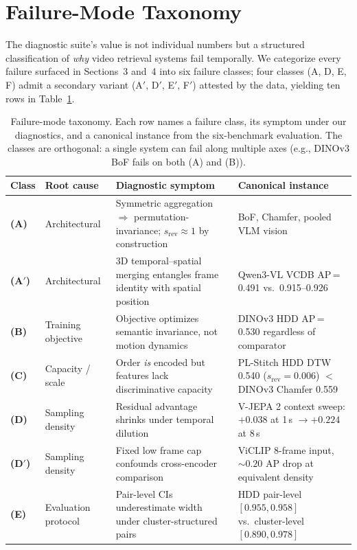 \documentclass{article}
\theoremstyle{remark}
\begin{document}
\section{Failure-Mode Taxonomy}
\label{sec:failure_taxonomy}

The diagnostic suite's value is not individual numbers but a structured classification of \emph{why} video retrieval systems fail temporally. We categorize every failure surfaced in Sections~3 and~4 into six failure classes; four classes (A, D, E, F) admit a secondary variant (A$'$, D$'$, E$'$, F$'$) attested by the data, yielding ten rows in Table~\ref{tab:failure_taxonomy}.

\begin{table}[h]
\centering
\small
\caption{Failure-mode taxonomy. Each row names a failure class, its symptom under our diagnostics, and a canonical instance from the six-benchmark evaluation. The classes are orthogonal: a single system can fail along multiple axes (e.g., DINOv3 BoF fails on both (A) and (B)).}
\label{tab:failure_taxonomy}
\begin{tabular}{llp{4.4cm}p{4.6cm}}
\toprule
\textbf{Class} & \textbf{Root cause} & \textbf{Diagnostic symptom} & \textbf{Canonical instance} \\
\midrule
\textbf{(A)} & Architectural & Symmetric aggregation $\Rightarrow$ permutation-invariance; $s_\text{rev}\!\approx\!1$ by construction & BoF, Chamfer, pooled VLM vision \\
\textbf{(A$'$)} & Architectural & 3D temporal--spatial merging entangles frame identity with spatial position & Qwen3-VL VCDB AP\,=\,0.491 vs.\ 0.915--0.926 \\
\textbf{(B)} & Training objective & Objective optimizes semantic invariance, not motion dynamics & DINOv3 HDD AP\,=\,0.530 regardless of comparator \\
\textbf{(C)} & Capacity / scale & Order \emph{is} encoded but features lack discriminative capacity & PL-Stitch HDD DTW 0.540 ($s_\text{rev}\!=\!0.006$) $<$ DINOv3 Chamfer 0.559 \\
\textbf{(D)} & Sampling density & Residual advantage shrinks under temporal dilution & V-JEPA 2 context sweep: $+0.038$ at 1\,s $\to +0.224$ at 8\,s \\
\textbf{(D$'$)} & Sampling density & Fixed low frame cap confounds cross-encoder comparison & ViCLIP 8-frame input, ${\sim}0.20$ AP drop at equivalent density \\
\textbf{(E)} & Evaluation protocol & Pair-level CIs underestimate width under cluster-structured pairs & HDD pair-level $[0.955, 0.958]$ vs.\ cluster-level $[0.890, 0.978]$ \\

\end{tabular}
\end{table}
\end{document}
